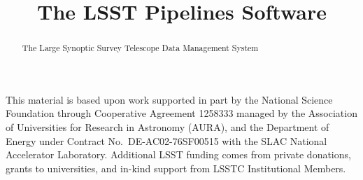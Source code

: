 \documentclass[twocolumn]{aastex62}
\begin{document}
\title{The LSST Pipelines Software}



\begin{abstract}

The Large Synoptic Survey Telescope Data Management System

\end{abstract}











\acknowledgments
This material is based upon work supported in part by the National Science Foundation through Cooperative Agreement 1258333 managed by the Association of Universities for Research in Astronomy (AURA), and the Department of Energy under Contract No.\ DE-AC02-76SF00515 with the SLAC National Accelerator Laboratory.
Additional LSST funding comes from private donations, grants to universities, and in-kind support from LSSTC Institutional Members.



\end{document}
